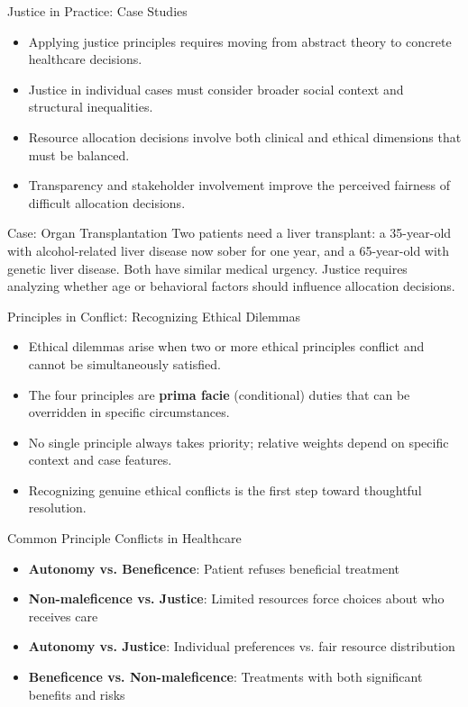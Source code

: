 \documentclass{beamer}
\begin{document}
	\begin{frame}{Justice in Practice: Case Studies}
		\begin{itemize}
			\item Applying justice principles requires moving from abstract theory to concrete healthcare decisions.
			\item Justice in individual cases must consider broader social context and structural inequalities.
			\item Resource allocation decisions involve both clinical and ethical dimensions that must be balanced.
			\item Transparency and stakeholder involvement improve the perceived fairness of difficult allocation decisions.
		\end{itemize}
		
		\begin{exampleblock}{Case: Organ Transplantation}
			Two patients need a liver transplant: a 35-year-old with alcohol-related liver disease now sober for one year, and a 65-year-old with genetic liver disease. Both have similar medical urgency. Justice requires analyzing whether age or behavioral factors should influence allocation decisions.
		\end{exampleblock}
	\end{frame}
	
	\begin{frame}{Principles in Conflict: Recognizing Ethical Dilemmas}
		\begin{itemize}
			\item Ethical dilemmas arise when two or more ethical principles conflict and cannot be simultaneously satisfied.
			\item The four principles are \textbf{prima facie} (conditional) duties that can be overridden in specific circumstances.
			\item No single principle always takes priority; relative weights depend on specific context and case features.
			\item Recognizing genuine ethical conflicts is the first step toward thoughtful resolution.
		\end{itemize}
		
		\begin{block}{Common Principle Conflicts in Healthcare}
			\begin{itemize}
				\item \textbf{Autonomy vs. Beneficence}: Patient refuses beneficial treatment
				\item \textbf{Non-maleficence vs. Justice}: Limited resources force choices about who receives care
				\item \textbf{Autonomy vs. Justice}: Individual preferences vs. fair resource distribution
				\item \textbf{Beneficence vs. Non-maleficence}: Treatments with both significant benefits and risks
			\end{itemize}
		\end{block}
	\end{frame}
	
\end{document}
